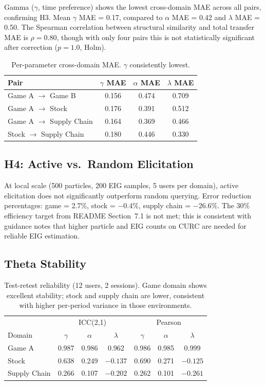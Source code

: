 \documentclass[11pt]{article}
\begin{document}
Gamma ($\gamma$, time preference) shows the lowest cross-domain MAE across
all pairs, confirming H3.  Mean $\gamma$ MAE = 0.17, compared to $\alpha$
MAE = 0.42 and $\lambda$ MAE = 0.50.  The Spearman correlation between
structural similarity and total transfer MAE is $\rho = 0.80$, though with
only four pairs this is not statistically significant after correction
($p = 1.0$, Holm).

\begin{table}[h]
\centering
\begin{tabular}{lccc}
\toprule
Pair & $\gamma$ MAE & $\alpha$ MAE & $\lambda$ MAE \\
\midrule
Game A $\to$ Game B & 0.156 & 0.474 & 0.709 \\
Game A $\to$ Stock & 0.176 & 0.391 & 0.512 \\
Game A $\to$ Supply Chain & 0.164 & 0.369 & 0.466 \\
Stock $\to$ Supply Chain & 0.180 & 0.446 & 0.330 \\
\bottomrule
\end{tabular}
\caption{Per-parameter cross-domain MAE.  $\gamma$ consistently lowest.}
\label{tab:h3_results}
\end{table}

\subsection{H4: Active vs.\ Random Elicitation}

At local scale (500 particles, 200 EIG samples, 5 users per domain),
active elicitation does not significantly outperform random querying.
Error reduction percentages: game = 2.7\%, stock = $-0.4$\%,
supply chain = $-26.6$\%.  The 30\% efficiency target from README
Section~7.1 is not met; this is consistent with guidance notes that
higher particle and EIG counts on CURC are needed for reliable EIG
estimation.

\subsection{Theta Stability}

\begin{table}[h]
\centering
\begin{tabular}{lcccccc}
\toprule
 & \multicolumn{3}{c}{ICC(2,1)} & \multicolumn{3}{c}{Pearson} \\
Domain & $\gamma$ & $\alpha$ & $\lambda$ & $\gamma$ & $\alpha$ & $\lambda$ \\
\midrule
Game A & 0.987 & 0.986 & 0.962 & 0.986 & 0.985 & 0.999 \\
Stock & 0.638 & 0.249 & $-0.137$ & 0.690 & 0.271 & $-0.125$ \\
Supply Chain & 0.266 & 0.107 & $-0.202$ & 0.262 & 0.101 & $-0.261$ \\
\bottomrule
\end{tabular}
\caption{Test-retest reliability (12 users, 2 sessions).  Game domain shows
excellent stability; stock and supply chain are lower, consistent with
higher per-period variance in those environments.}
\label{tab:stability}
\end{table}
\end{document}
